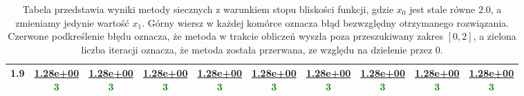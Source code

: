 \begin{table}[H]
\begin{tabular}{|l||c|c|c|c|c|c|c|c|c|}
\hline
 1.9 & \makecell{\ul{1.28e+00} \\ \textcolor{Green}{3}} & \makecell{\ul{1.28e+00} \\ \textcolor{Green}{3}} & \makecell{\ul{1.28e+00} \\ \textcolor{Green}{3}} & \makecell{\ul{1.28e+00} \\ \textcolor{Green}{3}} & \makecell{\ul{1.28e+00} \\ \textcolor{Green}{3}} & \makecell{\ul{1.28e+00} \\ \textcolor{Green}{3}} & \makecell{\ul{1.28e+00} \\ \textcolor{Green}{3}} & \makecell{\ul{1.28e+00} \\ \textcolor{Green}{3}} & \makecell{\ul{1.28e+00} \\ \textcolor{Green}{3}} \\
\hline
 \bottomrule
\end{tabular}
\caption{Tabela przedstawia wyniki metody siecznych z warunkiem stopu bliskości funkcji, gdzie $x_0$ jest stale równe $2.0$, a zmieniamy jedynie wartość $x_1$.
Górny wiersz w każdej komórce oznacza błąd bezwzględny otrzymanego rozwiązania.
Czerwone podkreślenie błędu oznacza, że metoda w trakcie obliczeń wyszła poza przeszukiwany zakres $[0,2]$, a zielona liczba iteracji oznacza, że metoda została
przerwana, ze względu na dzielenie przez 0.}
\label{tab:secant_fx_a}
\end{table}